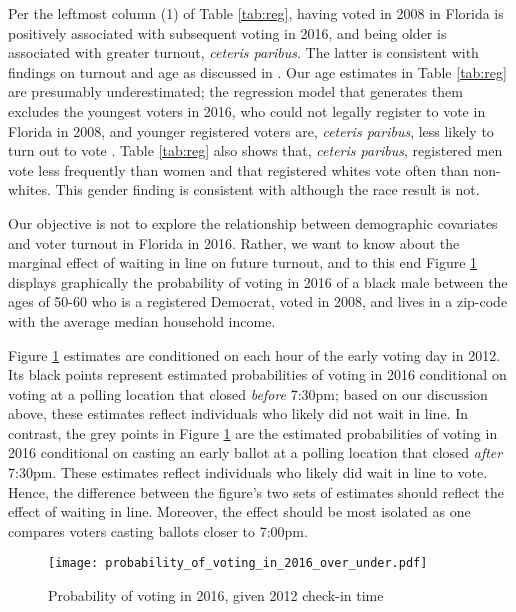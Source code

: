 \documentclass[12pt,titlepage]{article}
\begin{document}
Per the leftmost column (1) of Table \ref{tab:reg}, having voted in
2008 in Florida is positively associated with subsequent voting in
2016, and being older is associated with greater turnout,
\emph{ceteris paribus}.  The latter is consistent with findings on
turnout and age as discussed in \citet{costaetal:walkingthewalk}.  Our
age estimates in Table \ref{tab:reg} are presumably underestimated;
the regression model that generates them excludes the youngest voters
in 2016, who could not legally register to vote in Florida in 2008,
and younger registered voters are, \emph{ceteris paribus}, less likely
to turn out to vote \citep{shinosmith:registrationtiming}.  Table
\ref{tab:reg} also shows that, \emph{ceteris paribus}, registered men
vote less frequently than women and that registered whites vote often
than non-whites.  This gender finding is consistent with
\citet{leighleynagler:whovotesnow} although the race result is not.

Our objective is not to explore the relationship between demographic
covariates and voter turnout in Florida in 2016.  Rather, we want to
know about the marginal effect of waiting in line on future turnout,
and to this end Figure \ref{fig:prvoting2016} displays graphically the
probability of voting in 2016 of a black male between the ages of
50-60 who is a registered Democrat, voted in 2008, and lives in a
zip-code with the average median household income. 

Figure \ref{fig:prvoting2016} estimates are conditioned on each hour
of the early voting day in 2012. Its black points represent estimated
probabilities of voting in 2016 conditional on voting at a polling
location that closed \emph{before} 7:30pm; based on our discussion
above, these estimates reflect individuals who likely did not wait in
line.  In contrast, the grey points in Figure \ref{fig:prvoting2016}
are the estimated probabilities of voting in 2016 conditional on
casting an early ballot at a polling location that closed \emph{after}
7:30pm.  These estimates reflect individuals who likely did wait in
line to vote.  Hence, the difference between the figure's two sets of
estimates should reflect the effect of waiting in line.  Moreover, the
effect should be most isolated as one compares voters casting ballots
closer to 7:00pm.

\begin{figure}[!ht]
\caption{Probability of voting in 2016, given 2012 check-in time}
  \label{fig:prvoting2016}
  \centering
    \centering\texttt{[image: probability\_of\_voting\_in\_2016\_over\_under.pdf]}
\end{figure}
\end{document}
